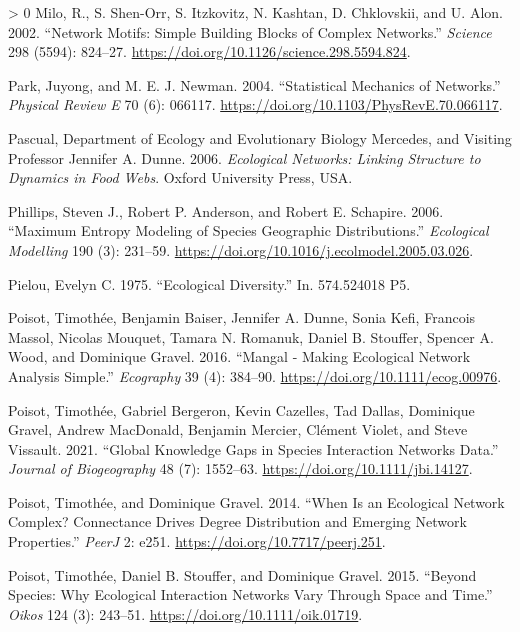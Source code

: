 \documentclass[10pt,oneside]{article}
\newlength{\cslhangindent}
\newenvironment{CSLReferences}[3] %
 {%
  \setlength{\parindent}{0pt}
  \ifodd #1 \everypar{\setlength{\hangindent}{\cslhangindent}}\ignorespaces\fi
  \ifnum #2 > 0
  \setlength{\parskip}{#2\baselineskip}
  \fi
 }%
 {}
\begin{document}
\begin{CSLReferences}{1}{0}
\leavevmode\hypertarget{ref-Milo2002NetMot}{}%
Milo, R., S. Shen-Orr, S. Itzkovitz, N. Kashtan, D. Chklovskii, and U.
Alon. 2002. {``Network Motifs: Simple Building Blocks of Complex
Networks.''} \emph{Science} 298 (5594): 824--27.
\url{https://doi.org/10.1126/science.298.5594.824}.

\leavevmode\hypertarget{ref-Park2004StaMeca}{}%
Park, Juyong, and M. E. J. Newman. 2004. {``Statistical Mechanics of
Networks.''} \emph{Physical Review E} 70 (6): 066117.
\url{https://doi.org/10.1103/PhysRevE.70.066117}.

\leavevmode\hypertarget{ref-Pascual2006EcoNeta}{}%
Pascual, Department of Ecology and Evolutionary Biology Mercedes, and
Visiting Professor Jennifer A. Dunne. 2006. \emph{Ecological Networks:
Linking Structure to Dynamics in Food Webs}. Oxford University Press,
USA.

\leavevmode\hypertarget{ref-Phillips2006MaxEnta}{}%
Phillips, Steven J., Robert P. Anderson, and Robert E. Schapire. 2006.
{``Maximum Entropy Modeling of Species Geographic Distributions.''}
\emph{Ecological Modelling} 190 (3): 231--59.
\url{https://doi.org/10.1016/j.ecolmodel.2005.03.026}.

\leavevmode\hypertarget{ref-Pielou1975EcoDiv}{}%
Pielou, Evelyn C. 1975. {``Ecological Diversity.''} In. 574.524018 P5.

\leavevmode\hypertarget{ref-Poisot2016ManMakb}{}%
Poisot, Timothée, Benjamin Baiser, Jennifer A. Dunne, Sonia Kefi,
Francois Massol, Nicolas Mouquet, Tamara N. Romanuk, Daniel B. Stouffer,
Spencer A. Wood, and Dominique Gravel. 2016. {``Mangal - Making
Ecological Network Analysis Simple.''} \emph{Ecography} 39 (4): 384--90.
\url{https://doi.org/10.1111/ecog.00976}.

\leavevmode\hypertarget{ref-Poisot2021GloKno}{}%
Poisot, Timothée, Gabriel Bergeron, Kevin Cazelles, Tad Dallas,
Dominique Gravel, Andrew MacDonald, Benjamin Mercier, Clément Violet,
and Steve Vissault. 2021. {``Global Knowledge Gaps in Species
Interaction Networks Data.''} \emph{Journal of Biogeography} 48 (7):
1552--63. \url{https://doi.org/10.1111/jbi.14127}.

\leavevmode\hypertarget{ref-Poisot2014WheEcoa}{}%
Poisot, Timothée, and Dominique Gravel. 2014. {``When Is an Ecological
Network Complex? Connectance Drives Degree Distribution and Emerging
Network Properties.''} \emph{PeerJ} 2: e251.
\url{https://doi.org/10.7717/peerj.251}.

\leavevmode\hypertarget{ref-Poisot2015SpeWhya}{}%
Poisot, Timothée, Daniel B. Stouffer, and Dominique Gravel. 2015.
{``Beyond Species: Why Ecological Interaction Networks Vary Through
Space and Time.''} \emph{Oikos} 124 (3): 243--51.
\url{https://doi.org/10.1111/oik.01719}.


\end{CSLReferences}
\end{document}
